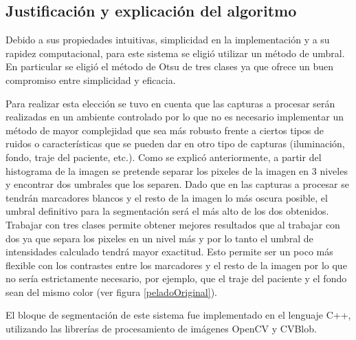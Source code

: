 


\subsection{Justificación y explicación del algoritmo}
Debido a sus propiedades intuitivas, simplicidad en la implementación y a su rapidez computacional, para este sistema se eligió utilizar un método de umbral. En particular se eligió el método de Otsu\cite{otsu} de tres clases ya que ofrece un buen compromiso entre simplicidad y eficacia. 

Para realizar esta elección se tuvo en cuenta que las capturas a procesar serán realizadas en un ambiente controlado por lo que no es necesario implementar un método de mayor complejidad que sea más robusto frente a ciertos tipos de ruidos o características que se pueden dar en otro tipo de capturas (iluminación, fondo, traje del paciente, etc.). 
Como se explicó anteriormente, a partir del histograma de la imagen se pretende separar los pixeles de la imagen en 3 niveles y encontrar dos umbrales que los separen. Dado que en las capturas a procesar se tendrán marcadores blancos y el resto de la imagen lo más oscura posible, el umbral definitivo para la segmentación será el más alto de los dos obtenidos. Trabajar con tres clases permite obtener mejores resultados que al trabajar con dos ya que separa los pixeles en un nivel más y por lo tanto el umbral de intensidades calculado tendrá mayor exactitud. Esto permite ser un poco más flexible con los contrastes entre los marcadores y el resto de la imagen por lo que no sería estrictamente necesario, por ejemplo, que el traje del paciente y el fondo sean del mismo color (ver figura \ref{peladoOriginal}).



El bloque de segmentación de este sistema fue implementado en el lenguaje C++, utilizando las librerías de procesamiento de imágenes OpenCV\cite{opencv} y CVBlob\cite{cvblob}. 

